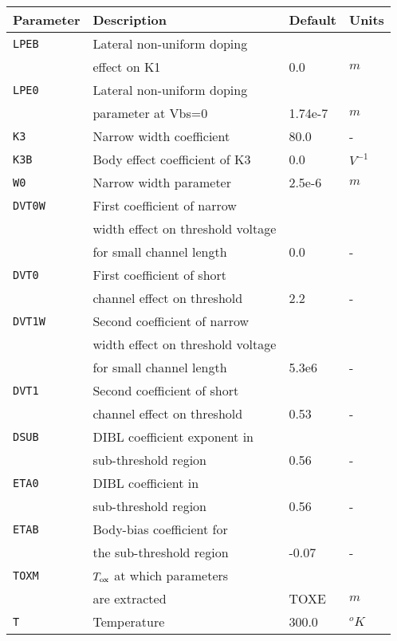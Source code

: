 \documentclass{article}
\begin{document}
\newpage
\begin{table}[H]
\begin{tabular}{|l| l| l| l|}
\hline
\textbf{Parameter} & \textbf{Description} & \textbf{Default} & \textbf{Units} \\
\hline
\texttt{LPEB} & Lateral non-uniform doping & & \\
              & effect on K1 & 0.0 & $m$\\
\texttt{LPE0} & Lateral non-uniform doping & & \\
              & parameter at Vbs=0 & 1.74e-7 & $m$\\
\texttt{K3} & Narrow width coefficient & 80.0 & -\\
\texttt{K3B} & Body effect coefficient of K3 & 0.0 & $V^{-1}$\\
\texttt{W0} & Narrow width parameter & 2.5e-6 & $m$\\
\texttt{DVT0W} & First coefficient of narrow & & \\
               & width effect on threshold voltage & & \\
               & for small channel length & 0.0 & -\\
\texttt{DVT0} & First coefficient of short & & \\
              & channel effect on threshold & 2.2 & -\\
\texttt{DVT1W} & Second coefficient of narrow & & \\
               & width effect on threshold voltage& & \\
               & for small channel length & 5.3e6 & -\\
\texttt{DVT1} & Second coefficient of short & & \\
              & channel effect on threshold & 0.53 & -\\
\texttt{DSUB} & DIBL coefficient exponent in & & \\
              & sub-threshold region & 0.56 & - \\
\texttt{ETA0} & DIBL coefficient in & & \\
              & sub-threshold region & 0.56 & - \\
\texttt{ETAB} & Body-bias coefficient for & & \\
              & the sub-threshold region & -0.07 & -\\
\texttt{TOXM} & $T_{\rm{ox}}$ at which parameters & & \\
              & are extracted & TOXE & $m$\\
\texttt{T} & Temperature & 300.0 & $ ^oK$\\

\end{tabular}
\end{table}
\end{document}
